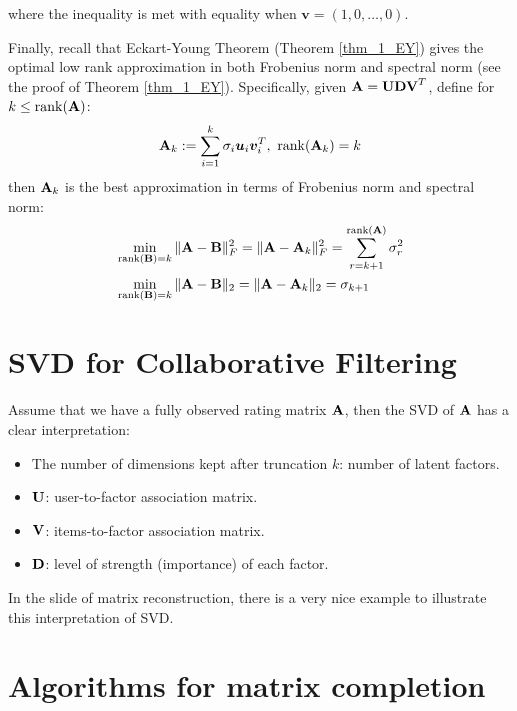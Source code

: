 \documentclass[../main.tex]{subfiles}
\begin{document}
where the inequality is met with equality when $\bm{v} = (1,0,\dots,0)$.
\par Finally, recall that Eckart-Young Theorem (Theorem \ref{thm_1_EY}) gives the optimal low rank approximation in both Frobenius norm and spectral norm (see the proof of Theorem \ref{thm_1_EY}). Specifically, given ${\bf A}={\bf UDV}^T$, define for $k\leq {\rm rank}({\bf A})$:
\begin{equation*}
{\bf A}_k :=\sum_{i=1}^{k}\sigma_i \bm{u}_i\bm{v}_i^T,\ {\rm rank}({\bf A}_k)=k
\end{equation*}
then ${\bf A}_k$ is the best approximation in terms of Frobenius norm and spectral norm:
\begin{align*}
&\min_{{\rm rank}({\bf B})=k}\|{\bf A}-{\bf B}\|^2_F=\|{\bf A}-{\bf A}_k\|_F^2=\sum_{r=k+1}^{{\rm rank}({\bf A})} \sigma_r^2\\
&\min_{{\rm rank}({\bf B})=k}\|{\bf A}-{\bf B}\|_2=\|{\bf A}-{\bf A}_k\|_2=\sigma_{k+1}
\end{align*}
\section{SVD for Collaborative Filtering}
Assume that we have a fully observed rating matrix ${\bf A}$, then the SVD of ${\bf A}$ has a clear interpretation:
\begin{itemize}
	\item The number of dimensions kept after truncation $k$: number of latent factors.
	\item ${\bf U}$: user-to-factor association matrix.
	\item ${\bf V}$: items-to-factor association matrix.
	\item ${\bf D}$: level of strength (importance) of each factor.
\end{itemize} 
In the slide of matrix reconstruction, there is a very nice example to illustrate this interpretation of SVD.
\section{Algorithms for matrix completion}\label{sec_3_alg_for_mc}
\end{document}
